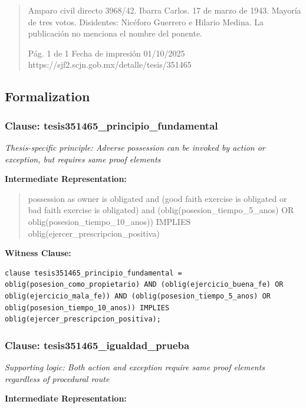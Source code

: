 \documentclass[11pt,a4paper]{article}
\begin{document}
\begin{quote}
Amparo civil directo 3968/42. Ibarra Carlos. 17 de marzo de 1943. Mayoría de tres votos.
Disidentes: Nicéforo Guerrero e Hilario Medina. La publicación no menciona el nombre del ponente.




                                              Pág. 1 de 1              Fecha de impresión 01/10/2025
  https://sjf2.scjn.gob.mx/detalle/tesis/351465

\end{quote}

\subsection{Formalization}

\subsubsection{Clause: tesis351465\_principio\_fundamental}

\textit{Thesis-specific principle: Adverse possession can be invoked by action or exception, but requires same proof elements}

\textbf{Intermediate Representation:}

\begin{quote}
possession as owner is obligated and (good faith exercise is obligated or bad faith exercise is obligated) and (oblig(posesion\_tiempo\_5\_anos) OR oblig(posesion\_tiempo\_10\_anos)) IMPLIES oblig(ejercer\_prescripcion\_positiva)
\end{quote}

\textbf{Witness Clause:}

\begin{lstlisting}[style=witnessstyle, language=Witness]
clause tesis351465_principio_fundamental = oblig(posesion_como_propietario) AND (oblig(ejercicio_buena_fe) OR oblig(ejercicio_mala_fe)) AND (oblig(posesion_tiempo_5_anos) OR oblig(posesion_tiempo_10_anos)) IMPLIES oblig(ejercer_prescripcion_positiva);
\end{lstlisting}

\subsubsection{Clause: tesis351465\_igualdad\_prueba}

\textit{Supporting logic: Both action and exception require same proof elements regardless of procedural route}

\textbf{Intermediate Representation:}
\end{document}
